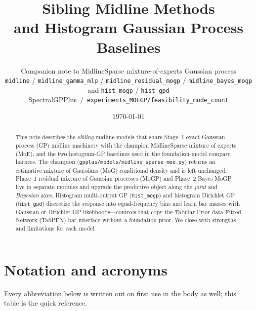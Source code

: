 \documentclass[11pt,a4paper]{article}
\title{\textbf{Sibling Midline Methods}\\
and Histogram Gaussian Process Baselines}
\author{Companion note to MidlineSparse mixture-of-experts Gaussian process\\
\texttt{midline} / \texttt{midline\_gamma\_mlp} /
\texttt{midline\_residual\_mogp} / \texttt{midline\_bayes\_mogp}\\
and \texttt{hist\_mogp} / \texttt{hist\_gpd}\\[0.4em]
\small SpectralGPPlus \,/\, \texttt{experiments\_MOEGP/feasibility\_mode\_count}}
\date{\today}
\theoremstyle{definition}
\begin{document}
\maketitle

\begin{abstract}
This note describes the \emph{sibling} midline models that share Stage~1 exact
Gaussian process (GP) midline machinery with the champion MidlineSparse mixture
of experts (MoE), and the two histogram-GP baselines used in the
foundation-model compare harness.
The champion
(\texttt{gpplus/models/midline\_sparse\_moe.py}) returns an estimative mixture of
Gaussians (MoG) conditional density and is left unchanged.
Phase~1 residual mixture of Gaussian processes (MoGP) and Phase~2 Bayes MoGP live
in separate modules and upgrade the predictive object along the \emph{joint} and
\emph{Bayesian} axes.
Histogram multi-output GP (\texttt{hist\_mogp}) and histogram Dirichlet GP
(\texttt{hist\_gpd}) discretize the response into equal-frequency bins and learn
bar masses with Gaussian or Dirichlet-GP likelihoods---controls that copy the
Tabular Prior-data Fitted Network (TabPFN) bar interface without a foundation
prior.
We close with strengths and limitations for each model.
\end{abstract}

\tableofcontents
\newpage

\section{Notation and acronyms}
\label{sec:acronyms}

Every abbreviation below is written out on first use in the body as well; this
table is the quick reference.
\end{document}

